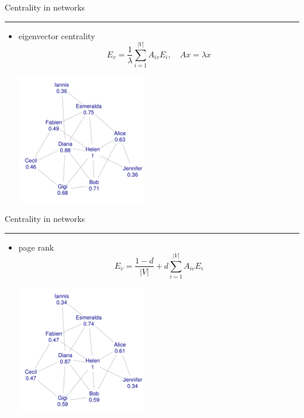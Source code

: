 \documentclass[landscape,fleqno]{foils}
\newcommand{\stitle}[1]{{\color{blue}\Large #1\par\vspace*{10pt}\hrule}}
\newenvironment{narrow}[2]{%
  \begin{list}{}{%
      \setlength{\topsep}{0pt}%
      \setlength{\leftmargin}{#1}%
      \setlength{\rightmargin}{#2}%
      \setlength{\listparindent}{\parindent}%
      \setlength{\itemindent}{\parindent}%
      \setlength{\parsep}{\parskip}}%
    \item[]}{\end{list}}
\begin{document}
\newpage
\stitle{Centrality in networks}
\begin{narrow}{0cm}{15cm}
\begin{itemize}
\item eigenvector centrality
\[ E_v = \frac{1}{\lambda} \sum_{i=1}^{|V|} A_{iv} E_i, 
   \quad Ax=\lambda x \]
\begin{center}
\vspace*{-1cm}
\includegraphics[width=0.45\textwidth]{ex-ev}
\end{center}
\end{itemize}
\end{narrow}

\newpage
\stitle{Centrality in networks}
\begin{narrow}{0cm}{15cm}
\begin{itemize}
\item page rank
\[ E_v =  \frac{1-d}{|V|} + d \sum_{i=1}^{|V|} A_{iv} E_i \]
\begin{center}
\vspace*{-1cm}
\includegraphics[width=0.45\textwidth]{ex-pagerank}
\end{center}
\end{itemize}
\end{narrow}
\end{document}
